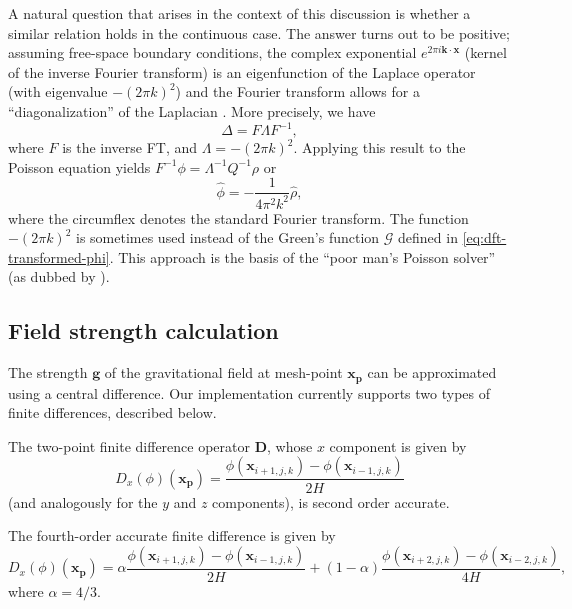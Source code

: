 A natural question that arises in the context of this discussion is whether a similar relation holds in the continuous case.
The answer turns out to be positive;
assuming free-space boundary conditions, the complex exponential $e^{2\pi i \mathbf{k} \cdot \mathbf{x}}$ (kernel of the inverse Fourier transform) is an eigenfunction of the Laplace operator (with eigenvalue $-(2\pi k)^2$) and the Fourier transform allows for a ``diagonalization'' of the Laplacian \cite{demanet2013fourier}.
More precisely, we have
\begin{equation*}
    \Delta = F \Lambda F^{-1},
\end{equation*}
where $F$ is the inverse FT, and $\Lambda = -(2\pi k)^2$.
Applying this result to the Poisson equation yields $F^{-1}\phi = \Lambda^{-1}Q^{-1}\rho$ or
\begin{equation*}
    \hat\phi = -\frac{1}{4\pi^2 k^2} \hat\rho,
\end{equation*}
where the circumflex denotes the standard Fourier transform.
The function $-(2\pi k)^2$ is sometimes used instead of the Green's function $\mathcal{G}$ defined in \autoref{eq:dft-transformed-phi}.
This approach is the basis of the ``poor man's Poisson solver'' (as dubbed by \cite{Hockney1988}).

\subsection{Field strength calculation}
The strength $\mathbf{g}$ of the gravitational field at mesh-point $\mathbf{x}_\mathbf{p}$ can be approximated using a central difference.
Our implementation currently supports two types of finite differences, described below.

The two-point finite difference operator $\mathbf{D}$, whose $x$ component is given by
\begin{equation*}
    D_x(\phi)(\mathbf{x_\mathbf{p}}) = \frac{\phi(\mathbf{x}_{i+1,j,k}) - \phi(\mathbf{x}_{i-1,j,k})}{2H}
\end{equation*}
(and analogously for the $y$ and $z$ components), is second order accurate.

The fourth-order accurate finite difference is given by
\begin{equation*}
    D_x(\phi)(\mathbf{x}_\mathbf{p}) = \alpha\frac{\phi(\mathbf{x}_{i+1,j,k}) - \phi(\mathbf{x}_{i-1,j,k})}{2H} + (1-\alpha)\frac{\phi(\mathbf{x}_{i+2,j,k}) - \phi(\mathbf{x}_{i-2,j,k})}{4H},
\end{equation*}
where $\alpha = 4/3$.

